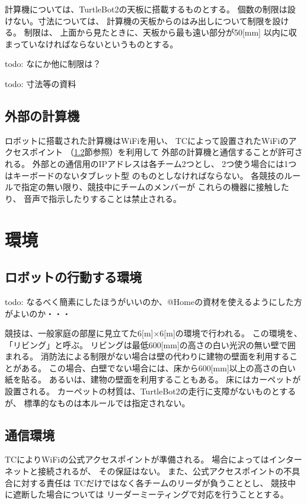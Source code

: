 \documentclass[a4j]{jarticle}
\begin{document}
計算機については、TurtleBot2の天板に搭載するものとする。
個数の制限は設けない。寸法については、
計算機の天板からのはみ出しについて制限を設ける。
制限は、
上面から見たときに、天板から最も遠い部分が50[mm]
以内に収まっていなければならないというものとする。

todo: なにか他に制限は？

todo: 寸法等の資料

\subsection{外部の計算機}

ロボットに搭載された計算機はWiFiを用い、
TCによって設置されたWiFiのアクセスポイント
（\ref{sub:network}節参照）を利用して
外部の計算機と通信することが許可される。
外部との通信用のIPアドレスは各チーム2つとし、
2つ使う場合には1つはキーボードのないタブレット型
のものとしなければならない。
各競技のルールで指定の無い限り、競技中にチームのメンバーが
これらの機器に接触したり、
音声で指示したりすることは禁止される。


\section{環境}

\subsection{ロボットの行動する環境}

todo: なるべく簡素にしたほうがいいのか、@Homeの資材を使えるようにした方がよいのか・・・

競技は、一般家庭の部屋に見立てた6[m]$\times$6[m]の環境で行われる。
この環境を、「リビング」と呼ぶ。
リビングは最低600[mm]の高さの白い光沢の無い壁で囲まれる。
消防法による制限がない場合は壁の代わりに建物の壁面を利用することがある。
この場合、白壁でない場合には、床から600[mm]以上の高さの白い紙を貼る。
あるいは、建物の壁面を利用することもある。
床にはカーペットが設置される。
カーペットの材質は、TurtleBot2の走行に支障がないものとするが、
標準的なものは本ルールでは指定されない。

\subsection{通信環境}\label{sub:network}

TCによりWiFiの公式アクセスポイントが準備される。
場合によってはインターネットと接続されるが、
その保証はない。
また、公式アクセスポイントの不具合に対する責任は
TCだけではなく各チームのリーダが負うこととし、
競技中に遮断した場合については
リーダーミーティングで対応を行うこととする。
\end{document}
